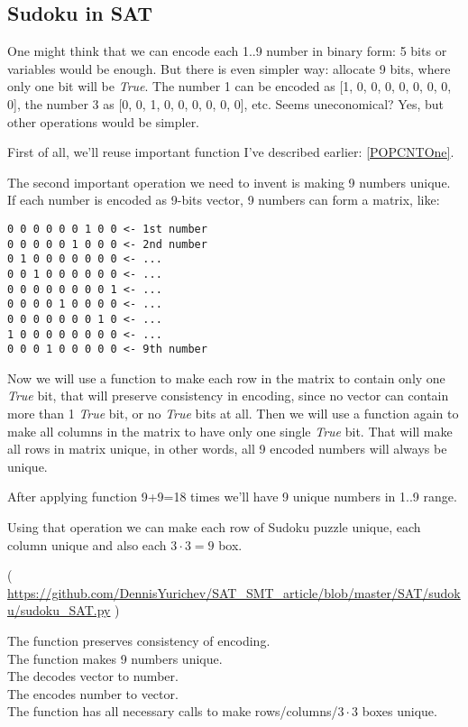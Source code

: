 \subsection{Sudoku in SAT}
\label{Sudoku_SAT}

One might think that we can encode each 1..9 number in binary form: 5 bits or variables would be enough.
But there is even simpler way: allocate 9 bits, where only one bit will be \textit{True}.
The number 1 can be encoded as [1, 0, 0, 0, 0, 0, 0, 0, 0], the number 3 as [0, 0, 1, 0, 0, 0, 0, 0, 0], etc.
Seems uneconomical? Yes, but other operations would be simpler.

First of all, we'll reuse important  function I've described earlier: \ref{POPCNTOne}.

The second important operation we need to invent is making 9 numbers unique.
If each number is encoded as 9-bits vector, 9 numbers can form a matrix, like:

\begin{lstlisting}
0 0 0 0 0 0 1 0 0 <- 1st number
0 0 0 0 0 1 0 0 0 <- 2nd number
0 1 0 0 0 0 0 0 0 <- ...
0 0 1 0 0 0 0 0 0 <- ...
0 0 0 0 0 0 0 0 1 <- ...
0 0 0 0 1 0 0 0 0 <- ...
0 0 0 0 0 0 0 1 0 <- ...
1 0 0 0 0 0 0 0 0 <- ...
0 0 0 1 0 0 0 0 0 <- 9th number
\end{lstlisting}

Now we will use a  function to make each row in the matrix to contain only one \textit{True} bit, that will
preserve consistency in encoding, since no vector can contain more than 1 \textit{True} bit, or no \textit{True} bits at all.
Then we will use a  function again to make all columns in the matrix to have only one single \textit{True} bit.
That will make all rows in matrix unique, in other words, all 9 encoded numbers will always be unique.

After applying  function 9+9=18 times we'll have 9 unique numbers in 1..9 range.

Using that operation we can make each row of Sudoku puzzle unique, each column unique and also each $3 \cdot 3=9$ box.


( \url{https://github.com/DennisYurichev/SAT_SMT_article/blob/master/SAT/sudoku/sudoku_SAT.py} )

The  function preserves consistency of encoding.\\
The  function makes 9 numbers unique.\\
The  decodes vector to number.\\
The  encodes number to vector.\\
The  function has all necessary calls to make rows/columns/$3\cdot 3$ boxes unique.

